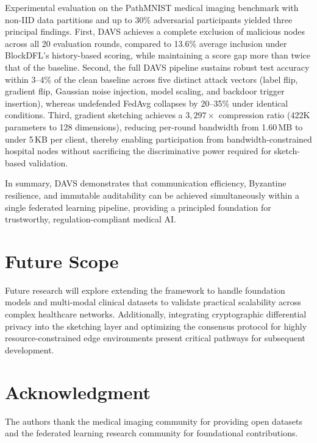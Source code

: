 \documentclass[conference]{IEEEtran}
\begin{document}
Experimental evaluation on the PathMNIST medical imaging benchmark with non-IID data partitions and up to 30\% adversarial participants yielded three principal findings. First, DAVS achieves a complete exclusion of malicious nodes across all 20 evaluation rounds, compared to 13.6\% average inclusion under BlockDFL's history-based scoring, while maintaining a score gap more than twice that of the baseline. Second, the full DAVS pipeline sustains robust test accuracy within 3--4\% of the clean baseline across five distinct attack vectors (label flip, gradient flip, Gaussian noise injection, model scaling, and backdoor trigger insertion), whereas undefended FedAvg collapses by 20--35\% under identical conditions. Third, gradient sketching achieves a $3{,}297\times$ compression ratio (422K parameters to 128 dimensions), reducing per-round bandwidth from 1.60\,MB to under 5\,KB per client, thereby enabling participation from bandwidth-constrained hospital nodes without sacrificing the discriminative power required for sketch-based validation.

In summary, DAVS demonstrates that communication efficiency, Byzantine resilience, and immutable auditability can be achieved simultaneously within a single federated learning pipeline, providing a principled foundation for trustworthy, regulation-compliant medical AI.

\section{Future Scope}
Future research will explore extending the framework to handle foundation models and multi-modal clinical datasets to validate practical scalability across complex healthcare networks. Additionally, integrating cryptographic differential privacy into the sketching layer and optimizing the consensus protocol for highly resource-constrained edge environments present critical pathways for subsequent development.

\section*{Acknowledgment}
The authors thank the medical imaging community for providing open datasets and the federated learning research community for foundational contributions.
\end{document}
